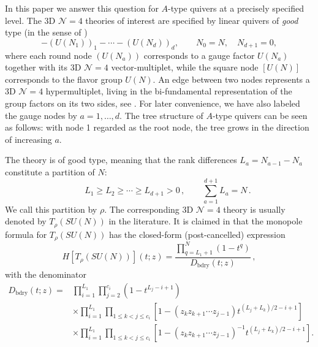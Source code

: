 \documentclass[12pt,a4paper]{article}
\newcommand{\bdry}{\mathrm{bdry}}
\begin{document}
\medskip

In this paper we answer this question for $A$-type quivers at a
precisely specified level.  The 3D $\mathcal N=4$ theories of interest are specified by linear quivers of \textit{good} type (in the sense of \cite{GaiottoWitten2009})
\begin{equation}
 [U(N)]-(U(N_1))_1-\cdots-(U(N_d))_d,
 \qquad N_0=N,\quad N_{d+1}=0,
 \label{eq:intro-quiver}
\end{equation}
where each round node $(U(N_a))$ corresponds to a gauge factor $U(N_a)$ together with its 3D $ \mathcal N=4$ vector-multiplet, while the square node $[U(N)]$ corresponds to the flavor group $U(N)$. An edge between two nodes represents a 3D $ \mathcal N=4$ hypermultiplet, living in the bi-fundamental representation of the group factors on its two sides, see \cite{ChenLi2026}. For later convenience, we have also labeled the gauge nodes by $a=1,\dots,d$.  The tree structure of $A$-type quivers can be seen as follows: with node 1 regarded as the root node, the tree grows in the direction of increasing $a$.

The theory is of good type, meaning that the rank differences
$L_a=N_{a-1}-N_a$ constitute a partition of $N$:
\begin{equation}
     \qquad L_1\geq L_2\geq\cdots\geq L_{d+1}>0\,,  \qquad \sum_{a=1}^{d+1}L_a=N\,.
      \label{eq:intro-partition}
\end{equation}
We call this partition by $\rho$. The corresponding 3D $\mathcal N=4$ theory is usually denoted by $T_\rho(SU(N))$ in the literature.
It is claimed in \cite{CremonesiEtAl2014} that the monopole formula for $T_\rho(SU(N))$ has the closed-form (post-cancelled) expression
\begin{equation}
 H[{T_\rho}(SU(N))](t;z)
 =\frac{\prod_{q=L_1+1}^{N}(1-t^q)}{D_{\bdry}(t;z)}\,,
 \label{eq:intro-main-reproduction}
\end{equation}
with the denominator {\small
\begin{equation}
\begin{aligned}
D_{\bdry}(t;z)
={}&\prod_{i=1}^{L_1}\prod_{j=2}^{c_i}
\left(1-t^{L_j-i+1}\right)
\\
&\times\prod_{i=1}^{L_1}\prod_{1\leq k<j\leq c_i}
\left[1-\left(z_k z_{k+1}\cdots z_{j-1}\right)
 t^{(L_j+L_k)/2-i+1}\right]
\\
&\times\prod_{i=1}^{L_1}\prod_{1\leq k<j\leq c_i}
\left[1-\left(z_k z_{k+1}\cdots z_{j-1}\right)^{-1}
 t^{(L_j+L_k)/2-i+1}\right].
\end{aligned}
\label{eq:intro-bdry-denominator}
\end{equation}}
\end{document}
